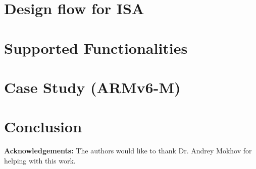 \documentclass[conference]{IEEEtran}
\begin{document}

\section{Design flow for ISA}
\label{sec:flow}
\section{Supported Functionalities}
\label{sec:functionalities}
\section{Case Study (ARMv6-M)}
\label{sec:arm}
\section{Conclusion}
\label{sec:conclusion}

\noindent\textbf{Acknowledgements:} The authors would like to thank Dr. Andrey Mokhov for helping with this work.
\end{document}
